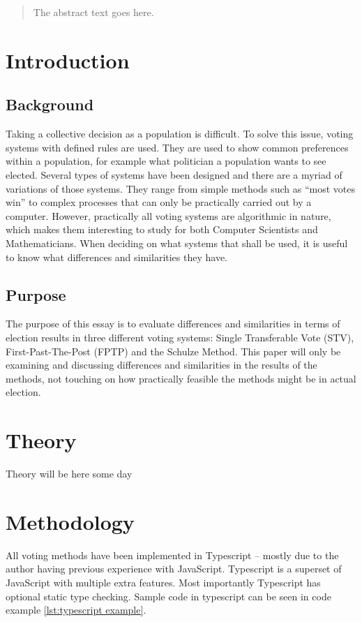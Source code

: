 \documentclass[12pt]{article}
\begin{document}


\pagebreak

\begin{abstract}
	The abstract text goes here.
\end{abstract}

\pagebreak

\tableofcontents

\pagebreak

\section{Introduction}
\subsection{Background}
Taking a collective decision as a population is difficult. To solve this issue, voting systems with defined rules are used. They are used to show common preferences within a population, for example what politician a population wants to see elected. Several types of systems have been designed and there are a myriad of variations of those systems. They range from simple methods such as “most votes win” to complex processes that can only be practically carried out by a computer. However, practically all voting systems are algorithmic in nature, which makes them interesting to study for both Computer Scientists and Mathematicians. When deciding on what systems that shall be used, it is useful to know what differences and similarities they have.
\subsection{Purpose}
The purpose of this essay is to evaluate differences and similarities in terms of election results in three different voting systems: Single Transferable Vote (STV), First-Past-The-Post (FPTP) and the Schulze Method. This paper will only be examining and discussing differences and similarities in the results of the methods, not touching on how practically feasible the methods might be in actual election.
\pagebreak
\section{Theory}
Theory will be here some day
\pagebreak
\section{Methodology}
All voting methods have been implemented in Typescript – mostly due to the author having previous experience with JavaScript. Typescript is a superset of JavaScript with multiple extra features. Most importantly Typescript has optional static type checking. Sample code in typescript can be seen in code example \ref{lst:typescript example}.
\end{document}
